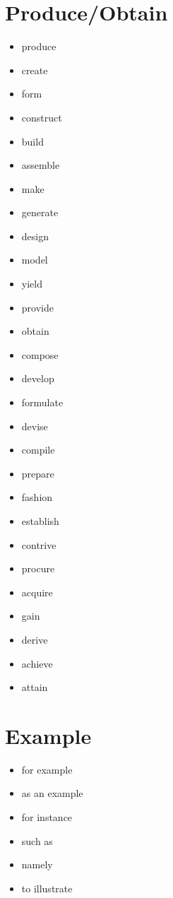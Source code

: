 \documentclass[twocolumn, a4paper]{article}
\begin{document}
\section{Produce/Obtain}
{\color{Plum}
	\begin{itemize}[leftmargin=*, noitemsep]
		\item produce
		\item create
		\item form
		\item construct
		\item build
		\item assemble
		\item make
		\item generate
		\item design
		\item model
		\item yield
		\item provide
		\item obtain
		\item compose
		\item develop
		\item formulate
		\item devise
		\item compile
		\item prepare
		\item fashion
		\item establish
		\item contrive
		\item procure
		\item acquire
		\item gain
		\item derive
		\item achieve
		\item attain
	\end{itemize}
}

\section{Example}
{\color{Orchid}
	\begin{itemize}[leftmargin=*, noitemsep]
		\item for example
		\item as an example
		\item for instance
		\item such as
		\item namely
		\item to illustrate
	\end{itemize}
}
\end{document}
